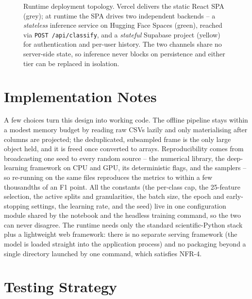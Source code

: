 \begin{figure}[htbp]
{%
    }
    \caption{Runtime deployment topology. Vercel delivers the static React SPA (grey); at runtime the SPA drives two independent backends -- a \emph{stateless} inference service on Hugging Face Spaces (green), reached via \texttt{POST /api/classify}, and a \emph{stateful} Supabase project (yellow) for authentication and per-user history. The two channels share no server-side state, so inference never blocks on persistence and either tier can be replaced in isolation.}
    \label{fig:deployment_topology}
\end{figure}

\section{Implementation Notes}
\label{sec:implementation_details}

\par A few choices turn this design into working code. The offline pipeline stays within a modest memory budget by reading raw CSVs lazily and only materialising after columns are projected; the deduplicated, subsampled frame is the only large object held, and it is freed once converted to arrays. Reproducibility comes from broadcasting one seed to every random source -- the numerical library, the deep-learning framework on CPU and GPU, its deterministic flags, and the samplers -- so re-running on the same files reproduces the metrics to within a few thousandths of an F1 point. All the constants (the per-class cap, the 25-feature selection, the active splits and granularities, the batch size, the epoch and early-stopping settings, the learning rate, and the seed) live in one configuration module shared by the notebook and the headless training command, so the two can never disagree. The runtime needs only the standard scientific-Python stack plus a lightweight web framework: there is no separate serving framework (the model is loaded straight into the application process) and no packaging beyond a single directory launched by one command, which satisfies NFR-4.

\section{Testing Strategy}
\label{sec:testing_strategy}

